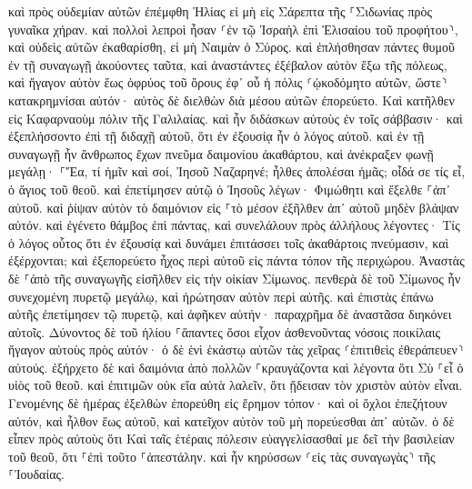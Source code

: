 \documentclass[twoside, 9pt]{extreport}
\begin{document}
καὶ πρὸς οὐδεμίαν αὐτῶν ἐπέμφθη Ἠλίας εἰ μὴ εἰς Σάρεπτα τῆς ⸀Σιδωνίας πρὸς γυναῖκα χήραν. 
καὶ πολλοὶ λεπροὶ ἦσαν ⸂ἐν τῷ Ἰσραὴλ ἐπὶ Ἐλισαίου τοῦ προφήτου⸃, καὶ οὐδεὶς αὐτῶν ἐκαθαρίσθη, εἰ μὴ Ναιμὰν ὁ Σύρος. 
καὶ ἐπλήσθησαν πάντες θυμοῦ ἐν τῇ συναγωγῇ ἀκούοντες ταῦτα, 
καὶ ἀναστάντες ἐξέβαλον αὐτὸν ἔξω τῆς πόλεως, καὶ ἤγαγον αὐτὸν ἕως ὀφρύος τοῦ ὄρους ἐφ᾽ οὗ ἡ πόλις ⸂ᾠκοδόμητο αὐτῶν, ὥστε⸃ κατακρημνίσαι αὐτόν· 
αὐτὸς δὲ διελθὼν διὰ μέσου αὐτῶν ἐπορεύετο. 
Καὶ κατῆλθεν εἰς Καφαρναοὺμ πόλιν τῆς Γαλιλαίας. καὶ ἦν διδάσκων αὐτοὺς ἐν τοῖς σάββασιν· 
καὶ ἐξεπλήσσοντο ἐπὶ τῇ διδαχῇ αὐτοῦ, ὅτι ἐν ἐξουσίᾳ ἦν ὁ λόγος αὐτοῦ. 
καὶ ἐν τῇ συναγωγῇ ἦν ἄνθρωπος ἔχων πνεῦμα δαιμονίου ἀκαθάρτου, καὶ ἀνέκραξεν φωνῇ μεγάλῃ· 
⸀Ἔα, τί ἡμῖν καὶ σοί, Ἰησοῦ Ναζαρηνέ; ἦλθες ἀπολέσαι ἡμᾶς; οἶδά σε τίς εἶ, ὁ ἅγιος τοῦ θεοῦ. 
καὶ ἐπετίμησεν αὐτῷ ὁ Ἰησοῦς λέγων· Φιμώθητι καὶ ἔξελθε ⸀ἀπ᾽ αὐτοῦ. καὶ ῥίψαν αὐτὸν τὸ δαιμόνιον εἰς ⸀τὸ μέσον ἐξῆλθεν ἀπ᾽ αὐτοῦ μηδὲν βλάψαν αὐτόν. 
καὶ ἐγένετο θάμβος ἐπὶ πάντας, καὶ συνελάλουν πρὸς ἀλλήλους λέγοντες· Τίς ὁ λόγος οὗτος ὅτι ἐν ἐξουσίᾳ καὶ δυνάμει ἐπιτάσσει τοῖς ἀκαθάρτοις πνεύμασιν, καὶ ἐξέρχονται; 
καὶ ἐξεπορεύετο ἦχος περὶ αὐτοῦ εἰς πάντα τόπον τῆς περιχώρου. 
Ἀναστὰς δὲ ⸀ἀπὸ τῆς συναγωγῆς εἰσῆλθεν εἰς τὴν οἰκίαν Σίμωνος. πενθερὰ δὲ τοῦ Σίμωνος ἦν συνεχομένη πυρετῷ μεγάλῳ, καὶ ἠρώτησαν αὐτὸν περὶ αὐτῆς. 
καὶ ἐπιστὰς ἐπάνω αὐτῆς ἐπετίμησεν τῷ πυρετῷ, καὶ ἀφῆκεν αὐτήν· παραχρῆμα δὲ ἀναστᾶσα διηκόνει αὐτοῖς. 
Δύνοντος δὲ τοῦ ἡλίου ⸀ἅπαντες ὅσοι εἶχον ἀσθενοῦντας νόσοις ποικίλαις ἤγαγον αὐτοὺς πρὸς αὐτόν· ὁ δὲ ἑνὶ ἑκάστῳ αὐτῶν τὰς χεῖρας ⸂ἐπιτιθεὶς ἐθεράπευεν⸃ αὐτούς. 
ἐξήρχετο δὲ καὶ δαιμόνια ἀπὸ πολλῶν ⸀κραυγάζοντα καὶ λέγοντα ὅτι Σὺ ⸀εἶ ὁ υἱὸς τοῦ θεοῦ. καὶ ἐπιτιμῶν οὐκ εἴα αὐτὰ λαλεῖν, ὅτι ᾔδεισαν τὸν χριστὸν αὐτὸν εἶναι. 
Γενομένης δὲ ἡμέρας ἐξελθὼν ἐπορεύθη εἰς ἔρημον τόπον· καὶ οἱ ὄχλοι ἐπεζήτουν αὐτόν, καὶ ἦλθον ἕως αὐτοῦ, καὶ κατεῖχον αὐτὸν τοῦ μὴ πορεύεσθαι ἀπ᾽ αὐτῶν. 
ὁ δὲ εἶπεν πρὸς αὐτοὺς ὅτι Καὶ ταῖς ἑτέραις πόλεσιν εὐαγγελίσασθαί με δεῖ τὴν βασιλείαν τοῦ θεοῦ, ὅτι ⸀ἐπὶ τοῦτο ⸀ἀπεστάλην. 
καὶ ἦν κηρύσσων ⸂εἰς τὰς συναγωγὰς⸃ τῆς ⸀Ἰουδαίας. 
\end{document}

